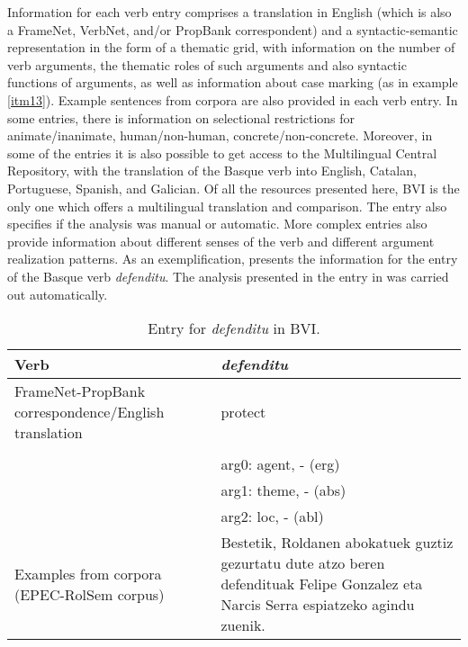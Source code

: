 \documentclass[english]{textolivre}
\begin{document}
Information for each verb entry comprises a translation in English (which is also a FrameNet, VerbNet, and/or PropBank correspondent) and a syntactic-semantic representation in the form of a thematic grid, with information on the number of verb arguments, the thematic roles of such arguments and also syntactic functions of arguments, as well as information about case marking (as in example \ref{itm13}). Example sentences from corpora are also provided in each verb entry. In some entries, there is information on selectional restrictions for animate/inanimate, human/non-human, concrete/non-concrete. Moreover, in some of the entries it is also possible to get access to the Multilingual Central Repository, with the translation of the Basque verb into English, Catalan, Portuguese, Spanish, and Galician. Of all the resources presented here, BVI is the only one which offers a multilingual translation and comparison. The entry also specifies if the analysis was manual or automatic. More complex entries also provide information about different senses of the verb and different argument realization patterns. As an exemplification,  presents the information for the entry of the Basque verb \textit{defenditu}. The analysis presented in the entry in  was carried out automatically.

\begin{table}[h!]
\centering
\begin{threeparttable}
\caption{Entry for \textit{defenditu} in BVI.}
\label{Table3}
\begin{tabular}{>{\raggedright}p{}p{}}
\toprule
Verb & \textit{defenditu} \\
\midrule
FrameNet-PropBank correspondence/English translation & protect \\
\multirow{3}{*}{Syntactic-semantic information} & \\	
& arg0: agent, - (erg) \\
& arg1: theme, - (abs) \\
& arg2: loc, - (abl) \\
Examples from corpora (EPEC-RolSem corpus) & Bestetik, Roldanen abokatuek guztiz gezurtatu dute atzo beren defendituak Felipe Gonzalez eta Narcis  Serra espiatzeko agindu zuenik.\protect\footnotemark \\
\bottomrule
\end{tabular}
\end{threeparttable}
\end{table}
\end{document}
